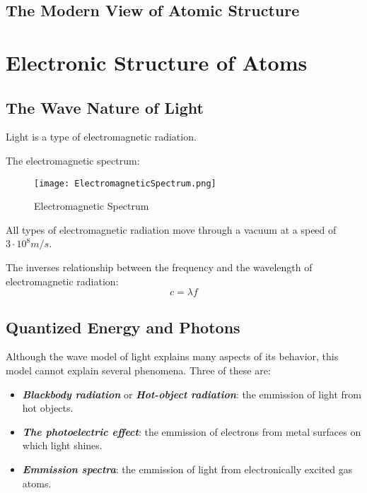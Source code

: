 \documentclass[12pt, a4paper]{report}
\newcommand{\impt}[1]{\textbf{\textit{#1}}}
\newcommand{\hi}{\section}
\newcommand{\mul}{\cdot}
\begin{document}
\hi{The Modern View of Atomic Structure}

\pagebreak

\chapter{Electronic Structure of Atoms}
\hi{The Wave Nature of Light}
    \par Light is a type of {electromagnetic radiation}.
    \par The electromagnetic spectrum:
        \begin{figure}[H]
            \begin{center}
                \texttt{[image: ElectromagneticSpectrum.png]}
                \caption[width=\textwidth]{Electromagnetic Spectrum}
            \end{center}
        \end{figure}
    \par All types of electromagnetic radiation move through a vacuum at a speed of
    $3 \mul 10^8 m/s$.
    \par The inverses relationship between the frequency and the wavelength of electromagnetic
    radiation:
        \begin{equation}
            c = \lambda f
        \end{equation}

\hi{Quantized Energy and Photons}
    \par Although the wave model of light explains many aspects of its behavior, this model cannot
    explain several phenomena. Three of these are:
    \begin{itemize}
        \item \impt{Blackbody radiation} or \impt{Hot-object radiation}:
            the emmission of light from hot objects.
        \item \impt{The photoelectric effect}: the emmission of electrons from metal surfaces on
            which light shines.
        \item \impt{Emmission spectra}: the emmission of light from electronically excited gas atoms.
    \end{itemize}
\end{document}
